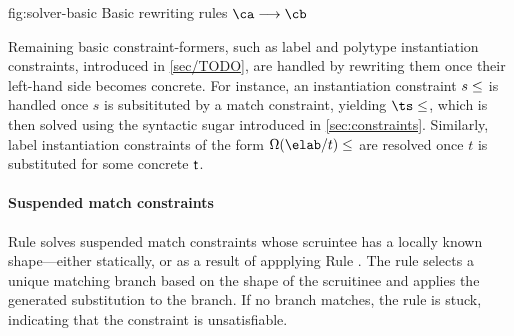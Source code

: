 \documentclass[acmsmall,screen,nonacm]{acmart}
\begin{document}
\begin{mathparfig}[t]
  {fig:solver-basic}
  {Basic rewriting rules $\ca \csolve \cb$}
  \rewrite[S-Unif]
    {\upa \\ \upa \unif \upb}
    {\upb}

  \rewrite[S-Let]
    {\clet \x \tv \ca \cb}
    {\cletr \x \tv \eset \ca \cb}

    {\cexists \tv {\ca \cand \cb}}

    {\cletr \x \tv {\tvs, \tvb} \ca \cb}

    {\cexists \tvb {\clet \x \tvs \ca \cb}}

    {\ca \cand \cletr \x \tv \tvs \cb \cc}

    {\cc \cand \Clet \x \tv \ca \cb}
\end{mathparfig}


Remaining basic constraint-formers, such as label and polytype instantiation
constraints, introduced in \cref{sec/TODO}, are handled by rewriting them once
their left-hand side becomes concrete. For instance, an instantiation
constraint $s \leq \relax$ is handled once $s$ is subsitituted by a match constraint,
yielding $\ts \leq \t$, which is then solved using the syntactic sugar
introduced in \cref{sec:constraints}. Similarly, label instantiation
constraints of the form $\Omega(\elab/t) \leq \t$ are resolved once $t$ is
substituted for some concrete $\mathrel{\mathsf{t}}\mathclose{}$.

\paragraph{Suspended match constraints}


Rule  solves suspended match constraints whose scruintee
has a locally known shape---either statically, or as a result of appplying
Rule . The rule selects a unique matching branch based on
the shape of the scruitinee and applies the generated substitution to the
branch. If no branch matches, the rule is stuck, indicating that the
constraint is unsatisfiable.
\end{document}
